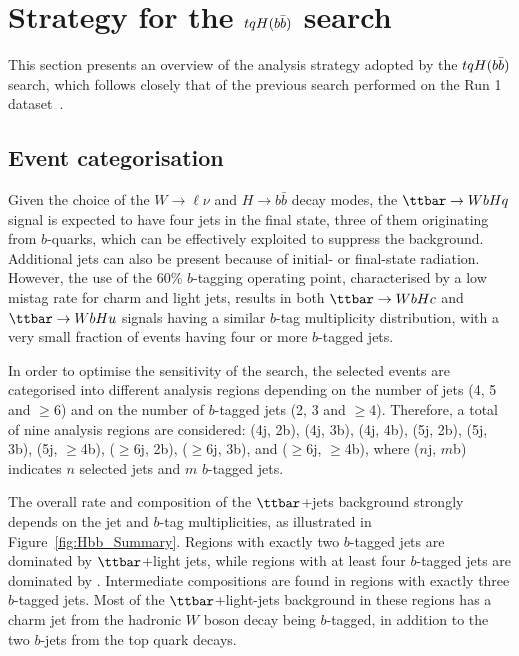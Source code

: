 
\section{Strategy for the $tqH(b\bar{b})$ search}
\label{sec:strategy_Hbb}

This section presents an overview of the analysis strategy adopted by the $tqH(b\bar{b})$ search, which
follows closely that of the previous search performed on the Run 1 dataset~\cite{Aad:2015pja}.

\subsection{Event categorisation}
\label{sec:event_categorisation}

Given the choice of the $W\to\ell\nu$ and $H\to b\bar{b}$ decay modes, the $\ttbar \to WbHq$ signal 
is expected to have four jets in the final state, three of them originating from $b$-quarks, which 
can be effectively exploited to suppress the background. 
Additional jets can also be present because of initial- or final-state radiation.
However, the use of the 60\% $b$-tagging operating point, characterised by a low mistag rate for
charm and light jets, results in both $\Hc$ and $\Hu$ signals having a similar $b$-tag multiplicity distribution,
with a very small fraction of events having four or more $b$-tagged jets.

In order to optimise the sensitivity of the search, the selected events are categorised into different analysis 
regions depending on the number of jets (4, 5 and $\geq$6) and on the number of $b$-tagged jets (2, 3 and $\geq$4).
Therefore, a total of nine analysis regions are considered:
(4j, 2b), (4j, 3b), (4j, 4b), (5j, 2b), (5j, 3b), (5j, $\geq$4b), ($\geq$6j, 2b), ($\geq$6j, 3b), and ($\geq$6j, $\geq$4b), 
where ($n$j, $m$b) indicates $n$ selected jets and $m$ $b$-tagged jets. 

The overall rate and composition of the $\ttbar$+jets background strongly depends on the jet and $b$-tag 
multiplicities, as illustrated in Figure~\ref{fig:Hbb_Summary}.
Regions with exactly two $b$-tagged jets are dominated by $\ttbar$+light jets, while regions with 
at least four $b$-tagged jets are dominated by \ttbin. Intermediate compositions are found in regions with exactly three 
$b$-tagged jets.  Most of the $\ttbar$+light-jets background in these regions has a charm jet from the hadronic $W$ boson 
decay  being $b$-tagged, in addition to the two $b$-jets from the top quark decays.

